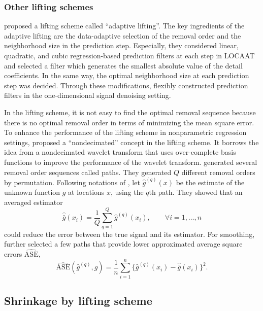 \documentclass[11pt,titlepage]{article}
\begin{document}
\subsubsection{Other lifting schemes}\label{subsec:otherlifting}
\cite{Nunes2006} proposed a lifting scheme called ``adaptive lifting''. The key ingredients of the adaptive lifting are the data-adaptive selection of the removal order and the neighborhood size in the prediction step. Especially, they considered linear, quadratic, and cubic regression-based prediction filters at each step in LOCAAT and selected a filter which generates the smallest absolute value of the detail coefficients. In the same way, the optimal neighborhood size at each prediction step was  decided. Through these modifications, \cite{Nunes2006} flexibly constructed prediction filters in the one-dimensional signal denoising setting. 

In the lifting scheme, it is not easy to find the optimal removal sequence because there is no optimal removal order in terms of minimizing the mean square error. To enhance the performance of the lifting scheme in nonparametric regression settings, \cite{Knight2009} proposed a ``nondecimated'' concept in the lifting scheme. It borrows the idea from a nondecimated wavelet transform that uses over-complete basis functions to improve the performance of the wavelet transform. \cite{Knight2009} generated several removal order sequences called paths. They generated $Q$ different removal orders by permutation. Following notations of \cite{Knight2009}, let $\hat{g}^{(q)}(x)$ be the estimate of the unknown function $g$ at locations $x$, using the $q$th path. They showed that an averaged estimator $$\hat{\bar{g}}(x_{i}) = \frac{1}{Q}\sum_{q=1}^{Q}\hat{g}^{(q)}(x_{i}), \qquad{\forall i = 1,\ldots , n}
$$
could reduce the error between the true signal and its estimator. For smoothing, \cite{Knight2009} further selected a few paths that provide lower approximated average square errors $\widehat{\text{ASE}}$,
\[
\widehat{\text{ASE}}(\hat{g}^{(q)},g) =\frac{1}{n}\sum_{i=1}^{n}\{ \hat{g}^{(q)}(x_i) -\hat{\bar{g}}(x_i) \}^{2}.
\]

\subsection{Shrinkage by lifting scheme}
\end{document}
